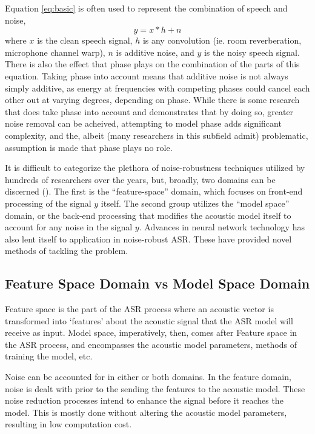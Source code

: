 \documentclass[dissertation,copyright]{uathesis}
\begin{document}
Equation \ref{eq:basic} is often used to represent the combination of speech and noise,
\begin{equation}\label{eq:basic}
y = x * h + n
\end{equation}
where $x$ is the clean speech signal, $h$ is any convolution (ie. room reverberation, microphone channel warp), $n$ is additive noise, and $y$ is the noisy speech signal.  There is also the effect that phase plays on the combination of the parts of this equation.  Taking phase into account means that additive noise is not always simply additive, as energy at frequencies with competing phases could cancel each other out at varying degrees, depending on phase.  While there is some research that does take phase into account and demonstrates that by doing so, greater noise removal can be acheived, attempting to model phase adds significant complexity, and the, albeit (many researchers in this subfield admit) problematic, assumption is made that phase plays no role.  


It is difficult to categorize the plethora of noise-robustness techniques utilized by hundreds of researchers over the years, but, broadly, two domains can be discerned (\cite{li:14,zhang:17}).  The first is the ``feature-space'' domain, which focuses on front-end processing of the signal $y$ itself.  The second group utilizes the ``model space'' domain, or the back-end processing that modifies the acoustic model itself to account for any noise in the signal $y$.  Advances in neural network technology has also lent itself to application in noise-robust ASR.  These have provided novel methods of tackling the problem.

\subsection{Feature Space Domain vs Model Space Domain}

Feature space is the part of the ASR process where an acoustic vector is transformed into `features' about the acoustic signal that the ASR model will receive as input.  Model space, imperatively, then, comes after Feature space in the ASR process, and encompasses the acoustic model parameters, methods of training the model, etc.

Noise can be accounted for in either or both domains.  In the feature domain, noise is dealt with prior to the sending the features to the acoustic model.  These noise reduction processes intend to enhance the signal before it reaches the model.  This is mostly done without altering the acoustic model parameters, resulting in low computation cost.
\end{document}
